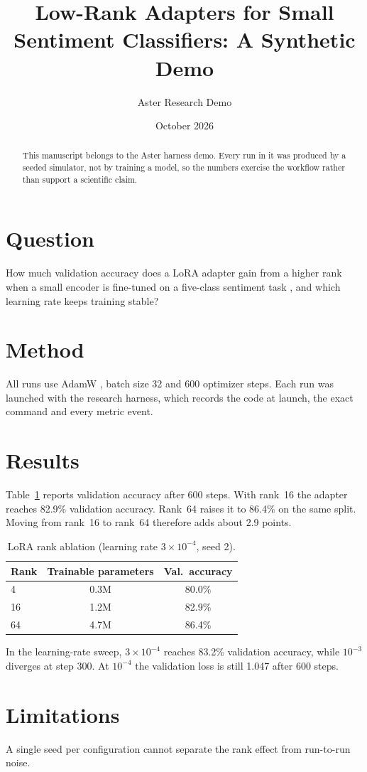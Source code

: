 \documentclass[11pt]{article}
\title{Low-Rank Adapters for Small Sentiment Classifiers: A Synthetic Demo}
\author{Aster Research Demo}
\date{October 2026}
\begin{document}
\maketitle

\begin{abstract}
This manuscript belongs to the Aster harness demo. Every run in it was produced by a
seeded simulator, not by training a model, so the numbers exercise the workflow
rather than support a scientific claim.
\end{abstract}

\section{Question}
How much validation accuracy does a LoRA adapter \cite{hu2022lora} gain from a higher
rank when a small encoder \cite{sanh2019distilbert} is fine-tuned on a five-class
sentiment task \cite{socher2013sst}, and which learning rate keeps training stable?

\section{Method}
All runs use AdamW \cite{loshchilov2019adamw}, batch size 32 and 600 optimizer steps.
Each run was launched with the research harness, which records the code at launch,
the exact command and every metric event.

\section{Results}
Table~\ref{tab:rank} reports validation accuracy after 600 steps.
With rank~16 the adapter reaches 82.9\% validation accuracy.
Rank~64 raises it to 86.4\% on the same split.
Moving from rank~16 to rank~64 therefore adds about 2.9 points.

\begin{table}[h]
  \centering
  \begin{tabular}{lcc}
    \toprule
    Rank & Trainable parameters & Val.\ accuracy \\
    \midrule
    4  & 0.3M & 80.0\% \\
    16 & 1.2M & 82.9\% \\
    64 & 4.7M & 86.4\% \\
    \bottomrule
  \end{tabular}
  \caption{LoRA rank ablation (learning rate $3\times10^{-4}$, seed 2).}
  \label{tab:rank}
\end{table}

In the learning-rate sweep, $3\times10^{-4}$ reaches 83.2\% validation accuracy, while
$10^{-3}$ diverges at step 300.
At $10^{-4}$ the validation loss is still 1.047 after 600 steps.

\section{Limitations}
A single seed per configuration cannot separate the rank effect from run-to-run noise.



\end{document}
